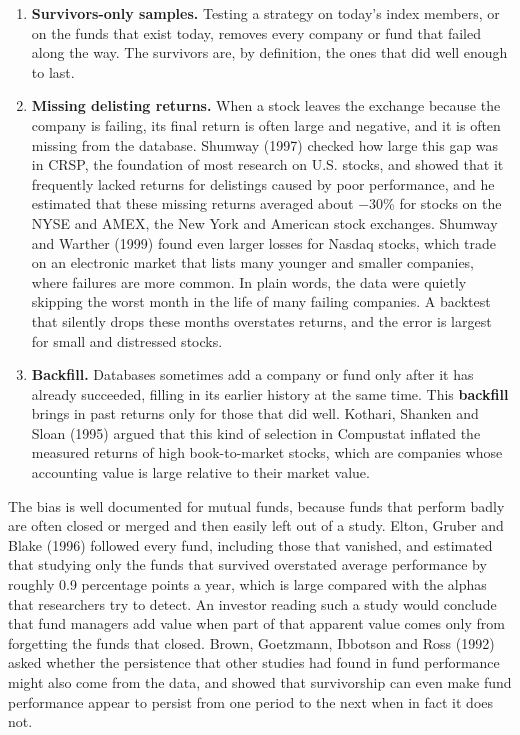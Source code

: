 \begin{enumerate}
  \item \textbf{Survivors-only samples.} Testing a strategy on today's index members, or on the funds that exist today, removes every company or fund that failed along the way. The survivors are, by definition, the ones that did well enough to last.
  \item \textbf{Missing delisting returns.} When a stock leaves the exchange because the company is failing, its final return is often large and negative, and it is often missing from the database. Shumway (1997) checked how large this gap was in CRSP, the foundation of most research on U.S. stocks, and showed that it frequently lacked returns for delistings caused by poor performance, and he estimated that these missing returns averaged about $-30$\% for stocks on the NYSE and AMEX, the New York and American stock exchanges. Shumway and Warther (1999) found even larger losses for Nasdaq stocks, which trade on an electronic market that lists many younger and smaller companies, where failures are more common. In plain words, the data were quietly skipping the worst month in the life of many failing companies. A backtest that silently drops these months overstates returns, and the error is largest for small and distressed stocks.
  \item \textbf{Backfill.} Databases sometimes add a company or fund only after it has already succeeded, filling in its earlier history at the same time. This \textbf{backfill} brings in past returns only for those that did well. Kothari, Shanken and Sloan (1995) argued that this kind of selection in Compustat inflated the measured returns of high book-to-market stocks, which are companies whose accounting value is large relative to their market value.
\end{enumerate}

The bias is well documented for mutual funds, because funds that perform badly are often closed or merged and then easily left out of a study. Elton, Gruber and Blake (1996) followed every fund, including those that vanished, and estimated that studying only the funds that survived overstated average performance by roughly 0.9 percentage points a year, which is large compared with the alphas that researchers try to detect. An investor reading such a study would conclude that fund managers add value when part of that apparent value comes only from forgetting the funds that closed. Brown, Goetzmann, Ibbotson and Ross (1992) asked whether the persistence that other studies had found in fund performance might also come from the data, and showed that survivorship can even make fund performance appear to persist from one period to the next when in fact it does not.

